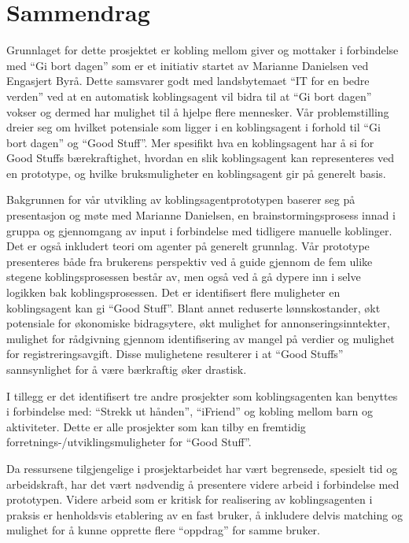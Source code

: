 \section*{Sammendrag}
Grunnlaget for dette prosjektet er kobling mellom giver og mottaker i forbindelse med ``Gi bort dagen'' som er et initiativ startet av Marianne Danielsen ved Engasjert Byrå. Dette samsvarer godt med landsbytemaet ``IT for en bedre verden'' ved at en automatisk koblingsagent vil bidra til at ``Gi bort dagen'' vokser og dermed har mulighet til å hjelpe flere mennesker. Vår problemstilling dreier seg om hvilket potensiale som ligger i en koblingsagent i forhold til ``Gi bort dagen'' og ``Good Stuff''. Mer spesifikt hva en koblingsagent har å si for Good Stuffs bærekraftighet, hvordan en slik koblingsagent kan representeres ved en prototype, og hvilke bruksmuligheter en koblingsagent gir på generelt basis. 

Bakgrunnen for vår utvikling av koblingsagentprototypen baserer seg på presentasjon og møte med Marianne Danielsen, en brainstormingsprosess innad i gruppa og gjennomgang av input i forbindelse med tidligere manuelle koblinger. Det er også inkludert teori om agenter på generelt grunnlag. Vår prototype presenteres både fra brukerens perspektiv ved å guide gjennom de fem ulike stegene koblingsprosessen består av, men også ved å gå dypere inn i selve logikken bak koblingsprosessen. Det er identifisert flere muligheter en koblingsagent kan gi ``Good Stuff''. Blant annet reduserte lønnskostander, økt potensiale for økonomiske bidragsytere, økt mulighet for annonseringsinntekter, mulighet for rådgivning gjennom identifisering av mangel på verdier og mulighet for registreringsavgift. Disse mulighetene resulterer i at ``Good Stuffs'' sannsynlighet for å være bærkraftig øker drastisk. 

I tillegg er det identifisert tre andre prosjekter som koblingsagenten kan benyttes i forbindelse med: ``Strekk ut hånden'', ``iFriend'' og kobling mellom barn og aktiviteter. Dette er alle prosjekter som kan tilby en fremtidig forretnings-/utviklingsmuligheter for ``Good Stuff''. 

Da ressursene tilgjengelige i prosjektarbeidet har vært begrensede, spesielt tid og arbeidskraft, har det vært nødvendig å presentere videre arbeid i forbindelse med prototypen. Videre arbeid som er kritisk for realisering av koblingsagenten i praksis er henholdsvis etablering av en fast bruker, å inkludere delvis matching og mulighet for å kunne opprette flere ``oppdrag'' for samme bruker. 
